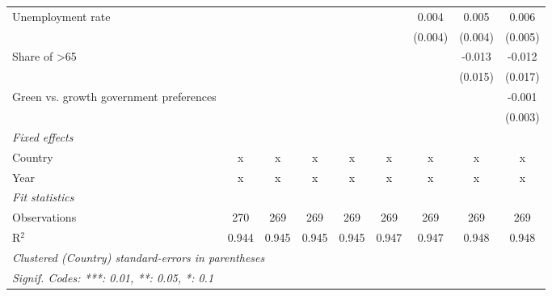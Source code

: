 \begin{table}[htbp]
\begin{tabular}{lcccccccc}
      Unemployment rate                                       &         &         &         &         &         & 0.004   & 0.005   & 0.006\\   
                                                              &         &         &         &         &         & (0.004) & (0.004) & (0.005)\\   
      Share of >65                                            &         &         &         &         &         &         & -0.013  & -0.012\\   
                                                              &         &         &         &         &         &         & (0.015) & (0.017)\\   
      Green vs. growth government preferences                 &         &         &         &         &         &         &         & -0.001\\   
                                                              &         &         &         &         &         &         &         & (0.003)\\   
      \emph{Fixed effects}\\
      Country                                                 & x       & x       & x       & x       & x       & x       & x       & x\\  
      Year                                                    & x       & x       & x       & x       & x       & x       & x       & x\\  
      \midrule \emph{Fit statistics}\\
      Observations                                            & 270     & 269     & 269     & 269     & 269     & 269     & 269     & 269\\  
      R$^2$                                                   & 0.944   & 0.945   & 0.945   & 0.945   & 0.947   & 0.947   & 0.948   & 0.948\\  
      \midrule
      \multicolumn{9}{l}{\emph{Clustered (Country) standard-errors in parentheses}}\\
      \multicolumn{9}{l}{\emph{Signif. Codes: ***: 0.01, **: 0.05, *: 0.1}}\\
   \end{tabular}
\end{table}


